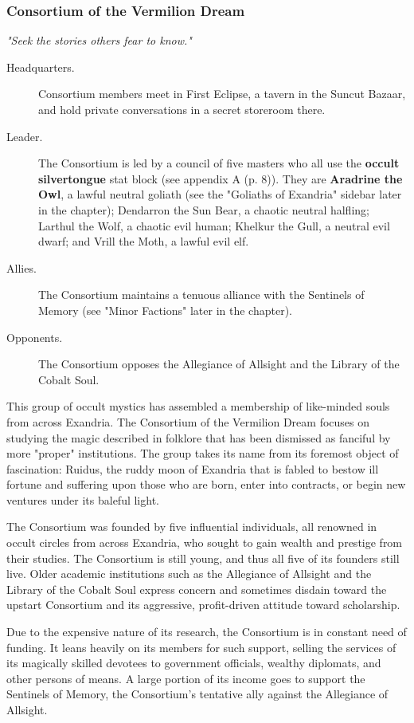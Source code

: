 \documentclass[a4paper, 11pt, bg=full, twocolumn, nooutline]{dndbook}
\begin{document}
\subsubsection{Consortium of the Vermilion Dream}

\textit{"Seek the stories others fear to know."}

\begin{description}
\item[Headquarters.] Consortium members meet in First Eclipse, a tavern in the Suncut Bazaar, and hold private conversations in a secret storeroom there.
\item[Leader.] The Consortium is led by a council of five masters who all use the \textbf{occult silvertongue} stat block (see appendix A (p. 8)). They are \textbf{Aradrine the Owl}, a lawful neutral goliath (see the "Goliaths of Exandria" sidebar later in the chapter); Dendarron the Sun Bear, a chaotic neutral halfling; Larthul the Wolf, a chaotic evil human; Khelkur the Gull, a neutral evil dwarf; and Vrill the Moth, a lawful evil elf.
\item[Allies.] The Consortium maintains a tenuous alliance with the Sentinels of Memory (see "Minor Factions" later in the chapter).
\item[Opponents.] The Consortium opposes the Allegiance of Allsight and the Library of the Cobalt Soul.
\end{description}

This group of occult mystics has assembled a membership of like-minded souls from across Exandria. The Consortium of the Vermilion Dream focuses on studying the magic described in folklore that has been dismissed as fanciful by more "proper" institutions. The group takes its name from its foremost object of fascination: Ruidus, the ruddy moon of Exandria that is fabled to bestow ill fortune and suffering upon those who are born, enter into contracts, or begin new ventures under its baleful light.

The Consortium was founded by five influential individuals, all renowned in occult circles from across Exandria, who sought to gain wealth and prestige from their studies. The Consortium is still young, and thus all five of its founders still live. Older academic institutions such as the Allegiance of Allsight and the Library of the Cobalt Soul express concern and sometimes disdain toward the upstart Consortium and its aggressive, profit-driven attitude toward scholarship.

Due to the expensive nature of its research, the Consortium is in constant need of funding. It leans heavily on its members for such support, selling the services of its magically skilled devotees to government officials, wealthy diplomats, and other persons of means. A large portion of its income goes to support the Sentinels of Memory, the Consortium's tentative ally against the Allegiance of Allsight.
\end{document}
